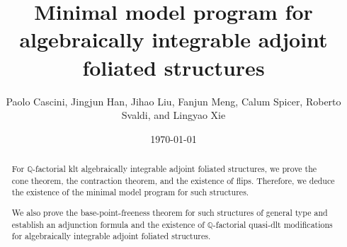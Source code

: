 \documentclass[12pt]{amsart}
\numberwithin{equation}{section}
\newcommand{\Qq}{\mathbb{Q}}
\theoremstyle{definition}
\theoremstyle{definition}
\theoremstyle{definition}
\begin{document}
\title{Minimal model program for algebraically integrable adjoint foliated structures}
\author{Paolo Cascini, Jingjun Han, Jihao Liu, Fanjun Meng, Calum Spicer, Roberto Svaldi, and Lingyao Xie}

\date{\today}

\begin{abstract}
For $\Qq$-factorial klt algebraically integrable adjoint foliated structures, we prove the cone theorem, the contraction theorem, and the existence of flips. Therefore, we deduce the existence of the minimal model program for such structures.

We also prove the base-point-freeness theorem for such structures of general type and establish an adjunction formula and the existence of $\Qq$-factorial quasi-dlt modifications for algebraically integrable adjoint foliated structures. 
\end{abstract}

\address{Department of Mathematics, Imperial College London, 180 Queen’s
Gate, London SW7 2AZ, UK}

\address{Shanghai Center for Mathematical Sciences, Fudan University, 2005 Songhu Road, Shanghai, 200438, China}

\address{Department of Mathematics, Northwestern University, 2033 Sheridan Road, Evanston, IL 60208, USA}

\address{Department of Mathematics, Johns Hopkins University, 3400 N. Charles Street, Baltimore, MD 21218, USA}

\address{Department of Mathematics, King’s College London, Strand, London WC2R 2LS, UK}

\address{Dipartimento di Matematica ``F. Enriques'', Universit\`a degli Studi di Milano, Via Saldini 50, 20133 Milano (MI), Italy}

\address{Department of Mathematics, University of California, San Diego, 9500 Gilman Drive \# 0112, La Jolla, CA 92093-0112, USA}

\maketitle

\pagestyle{myheadings}
\end{document}

